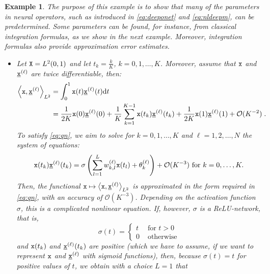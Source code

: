 \documentclass[10pt]{article}
\numberwithin{equation}{section}
\newtheorem{example}[example]{Example}
\theoremstyle{nonumberplain}
\newcommand{\inner}[2]{\left<#1,#2\right>}
\newcommand{\X}{{\tt X}}
\newcommand{\x}{{\tt x}}
\newcommand{\ulx}{\underline{\x}}
\begin{document}
\begin{example}\label{ex:customized} The purpose of this example is to show that many of the parameters in neural operators, such as introduced in \autoref{eq:deeponet} and \autoref{eq:nldeepm}, can be predetermined. Some parameters can be found, for instance, from classical integration formulas, as we show in the next example. Moreover, integration formulas also provide approximation error estimates.
	\begin{itemize}
		\item Let $\X = L^2(0,1)$ and let $t_k = \frac{k}{K}$, $k=0,1,\ldots,K$. Moreover, assume that $\x$ and $\ulx^{(\ell)}$ are twice differentiable, then:
		\begin{equation*}
			\begin{aligned}
			\inner{\x}{\ulx^{(\ell)}}_{L^2} &= \int_0^1 \x(t) \ulx^{(\ell)}(t) \mathrm{d}t \\
			&= 
			\frac{1}{2K} \x(0) \ulx^{(\ell)}(0) + \frac{1}{K} \sum_{k=1}^{K-1} \x(t_k) \ulx^{(\ell)}(t_k) + \frac{1}{2K} \x(1) \ulx^{(\ell)}(1) + \mathcal{O}(K^{-2})\;.
			\end{aligned}
		\end{equation*}
		To satisfy \autoref{eq:qn}, we aim to solve for $k=0,1,\ldots,K$ and $\ell=1,2,\ldots,N$ the system of equations:
	    \begin{equation} \label{eq:expl}
	       \x(t_k) \ulx^{(\ell)}(t_k)	= 
	       \sigma \left(\sum_{l=1}^{L}w_{k,l}^{(\ell)}\x(t_l) + \theta_k^{(\ell)}\right) + \mathcal{O}(K^{-3}) \text{ for } k=0,\ldots,K. 
	    \end{equation}
	    Then, the functional $\x \mapsto \inner{\x}{\ulx^{(\ell)}}_{L^2}$ is approximated in the form required in \autoref{eq:qn},  with an accuracy of $\mathcal{O}(K^{-3})$.
	    Depending on the activation function $\sigma$, this is a complicated nonlinear equation. If, however, $\sigma$ is a ReLU-network, that is, 
	    \begin{equation*}
	    	\sigma(t) = \left\{ \begin{array}{rl} t & \text{ for } t >0 \\
	    	0 & \text{ otherwise} \end{array}\right.
	    \end{equation*}	    
	     and $\x(t_k)$ and $\ulx^{(\ell)}(t_k)$ are positive (which we have to assume, if we want to represent $\x$ and $\ulx^{(\ell)}$ with sigmoid functions), then, because $\sigma(t)=t$ for positive values of $t$, we obtain with a choice $L=1$ that
        \begin{equation} \label{eq:expl2}

\end{equation}
\end{itemize}
\end{example}
\end{document}
